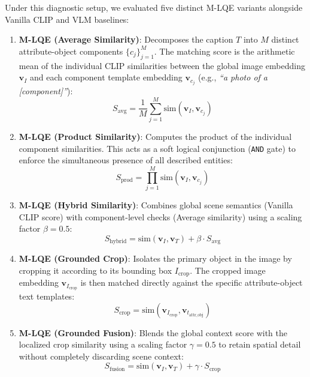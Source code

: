 \documentclass[11pt,a4paper]{article}
\begin{document}
Under this diagnostic setup, we evaluated five distinct M-LQE variants alongside Vanilla CLIP and VLM baselines:

\begin{enumerate}
    \item \textbf{M-LQE (Average Similarity)}: Decomposes the caption $T$ into $M$ distinct attribute-object components $\{c_j\}_{j=1}^M$. The matching score is the arithmetic mean of the individual CLIP similarities between the global image embedding $\mathbf{v}_I$ and each component template embedding $\mathbf{v}_{c_j}$ (e.g., \textit{``a photo of a [component]''}):
    \begin{equation}
        S_{\text{avg}} = \frac{1}{M}\sum_{j=1}^M \text{sim}(\mathbf{v}_I, \mathbf{v}_{c_j})
    \end{equation}
    
    \item \textbf{M-LQE (Product Similarity)}: Computes the product of the individual component similarities. This acts as a soft logical conjunction (\texttt{AND} gate) to enforce the simultaneous presence of all described entities:
    \begin{equation}
        S_{\text{prod}} = \prod_{j=1}^M \text{sim}(\mathbf{v}_I, \mathbf{v}_{c_j})
    \end{equation}
    
    \item \textbf{M-LQE (Hybrid Similarity)}: Combines global scene semantics (Vanilla CLIP score) with component-level checks (Average similarity) using a scaling factor $\beta = 0.5$:
    \begin{equation}
        S_{\text{hybrid}} = \text{sim}(\mathbf{v}_I, \mathbf{v}_T) + \beta \cdot S_{\text{avg}}
    \end{equation}
    
    \item \textbf{M-LQE (Grounded Crop)}: Isolates the primary object in the image by cropping it according to its bounding box $I_{\text{crop}}$. The cropped image embedding $\mathbf{v}_{I_{\text{crop}}}$ is then matched directly against the specific attribute-object text templates:
    \begin{equation}
        S_{\text{crop}} = \text{sim}(\mathbf{v}_{I_{\text{crop}}}, \mathbf{v}_{t_{\text{attr\_obj}}})
    \end{equation}
    
    \item \textbf{M-LQE (Grounded Fusion)}: Blends the global context score with the localized crop similarity using a scaling factor $\gamma = 0.5$ to retain spatial detail without completely discarding scene context:
    \begin{equation}
        S_{\text{fusion}} = \text{sim}(\mathbf{v}_I, \mathbf{v}_T) + \gamma \cdot S_{\text{crop}}
    \end{equation}
\end{enumerate}
\end{document}
